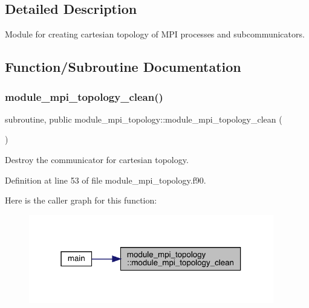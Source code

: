 \subsection{Detailed Description}
Module for creating cartesian topology of M\+PI processes and subcommunicators. 

\subsection{Function/\+Subroutine Documentation}
\mbox{\label{namespacemodule__mpi__topology_aba41ff8d55ee4cd7371e7165ed1a3316}} 
\subsubsection{\texorpdfstring{module\_mpi\_topology\_clean()}{module\_mpi\_topology\_clean()}}
{\footnotesize\ttfamily subroutine, public module\+\_\+mpi\+\_\+topology\+::module\+\_\+mpi\+\_\+topology\+\_\+clean (\begin{DoxyParamCaption}{ }\end{DoxyParamCaption})}



Destroy the communicator for cartesian topology. 



Definition at line 53 of file module\+\_\+mpi\+\_\+topology.\+f90.

Here is the caller graph for this function\+:\nopagebreak
\begin{figure}[H]
\begin{center}
\leavevmode
\includegraphics[width=303pt]{namespacemodule__mpi__topology_aba41ff8d55ee4cd7371e7165ed1a3316_icgraph}
\end{center}
\end{figure}
\mbox{\label{namespacemodule__mpi__topology_a162ac095bb487254991dd12ad5ac8935}} 
